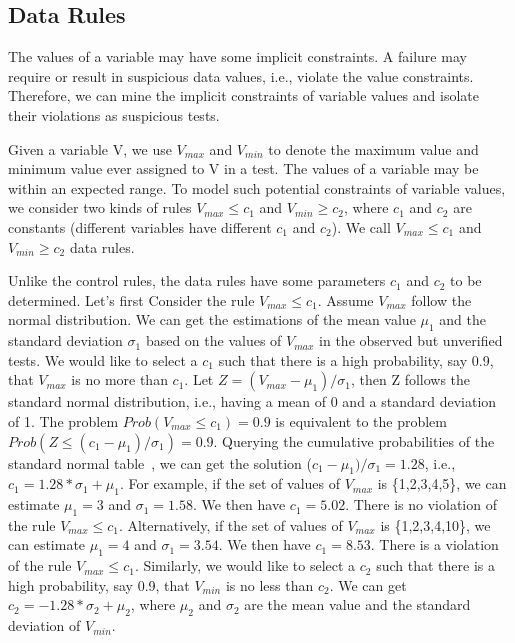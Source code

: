 \documentclass{sig-alternate}
\begin{document}
\subsection{Data Rules}

The values of a variable may have some implicit constraints. A
failure may require or result in suspicious data values, i.e.,
violate the value constraints. Therefore, we can mine the implicit
constraints of variable values and isolate their violations as
suspicious tests.

Given a variable V, we use $V_{max}$ and $V_{min}$ to denote the
maximum value and minimum value ever assigned to V in a test. The
values of a variable may be within an expected range. To model such
potential constraints of variable values, we consider two kinds of
rules $V_{max}\le c_1$ and $V_{min}\ge c_2$, where $c_1$ and $c_2$
are constants (different variables have different $c_1$ and $c_2$).
We call $V_{max}\le c_1$ and $V_{min}\ge c_2$ data rules.


Unlike the control rules, the data rules have some parameters $c_1$
and $c_2$ to be determined. Let's first Consider the rule
$V_{max}\le c_1$. Assume $V_{max}$ follow the normal distribution.
We can get the estimations of the mean value $\mu_1$ and the
standard deviation $\sigma_1$ based on the values of $V_{max}$ in
the observed but unverified tests. We would like to select a $c_1$
such that there is a high probability, say 0.9, that $V_{max}$ is no
more than $c_1$. Let $Z=(V_{max}-\mu_1) / \sigma_1$, then Z follows
the standard normal distribution, i.e., having a mean of 0 and a
standard deviation of 1. The problem $Prob(V_{max}\le c_1)=0.9$ is
equivalent to the problem $Prob(Z\le (c_1-\mu_1)/\sigma_1)=0.9$.
Querying the cumulative probabilities of the standard normal
table~\cite{Normal}, we can get the solution
($c_1-\mu_1)/\sigma_1=1.28$, i.e., $c_1=1.28*\sigma_1+\mu_1$. For
example, if the set of values of $V_{max}$ is \{1,2,3,4,5\}, we can
estimate $\mu_1=3$ and $\sigma_1=1.58$. We then have $c_1=5.02$.
There is no violation of the rule $V_{max}\le c_1$. Alternatively,
if the set of values of $V_{max}$ is \{1,2,3,4,10\}, we can estimate
$\mu_1=4$ and $\sigma_1=3.54$. We then have $c_1=8.53$. There is a
violation of the rule $V_{max}\le c_1$. Similarly, we would like to
select a $c_2$ such that there is a high probability, say 0.9, that
$V_{min}$ is no less than $c_2$. We can get
$c_2=-1.28*\sigma_2+\mu_2$, where $\mu_2$ and $\sigma_2$ are the
mean value and the standard deviation of $V_{min}$.
\end{document}
